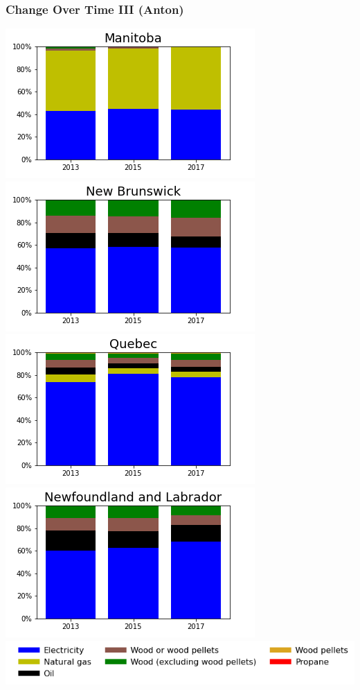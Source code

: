 \documentclass{beamer}
\begin{document}
\begin{frame}
\frametitle{Change Over Time III (Anton)}
\includegraphics[width=0.5\linewidth]{mn.png}%
\includegraphics[width=0.5\linewidth]{nb.png}\\
\includegraphics[width=0.5\linewidth]{qc.png}%
\includegraphics[width=0.5\linewidth]{nl.png}\\
\includegraphics[width=\linewidth]{leg_bar.png}
\end{frame}
\end{document}
